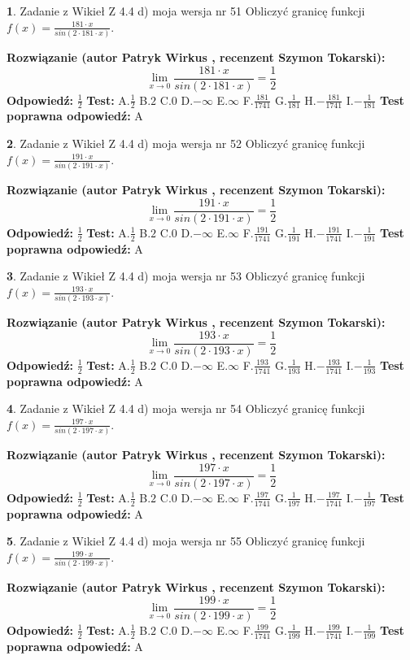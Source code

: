 \documentclass[12pt, a4paper]{article}
\theoremstyle{definition} %
\newtheorem{zad}{}
\newcommand{\zadStart}[1]{\begin{zad}#1\newline}
\newcommand{\zadStop}{\end{zad}}
\newcommand{\rozwStart}[2]{\noindent \textbf{Rozwiązanie (autor #1 , recenzent #2): }\newline}
\newcommand{\rozwStop}{\newline}
\newcommand{\odpStart}{\noindent \textbf{Odpowiedź:}\newline}
\newcommand{\odpStop}{\newline}
\newcommand{\testStart}{\noindent \textbf{Test:}\newline}
\newcommand{\testStop}{\newline}
\newcommand{\kluczStart}{\noindent \textbf{Test poprawna odpowiedź:}\newline}
\newcommand{\kluczStop}{\newline}
\begin{document}
\zadStart{Zadanie z Wikieł Z 4.4 d) moja wersja nr 51}
Obliczyć granicę funkcji $f(x)=\frac{181\cdot x}{sin(2 \cdot181\cdot x)}$.
\zadStop
\rozwStart{Patryk Wirkus}{Szymon Tokarski}
$$\lim\limits_{x\to 0}\frac{181\cdot x}{sin(2 \cdot181\cdot x)}=\frac{1}{2}$$
\rozwStop
\odpStart
$\frac{1}{2}$
\odpStop
\testStart
A.$\frac{1}{2}$
B.$2$
C.$0$
D.$-\infty$
E.$\infty$
F.$\frac{181}{1741}$
G.$\frac{1}{181}$
H.$-\frac{181}{1741}$
I.$-\frac{1}{181}$
\testStop
\kluczStart
A
\kluczStop



\zadStart{Zadanie z Wikieł Z 4.4 d) moja wersja nr 52}
Obliczyć granicę funkcji $f(x)=\frac{191\cdot x}{sin(2 \cdot191\cdot x)}$.
\zadStop
\rozwStart{Patryk Wirkus}{Szymon Tokarski}
$$\lim\limits_{x\to 0}\frac{191\cdot x}{sin(2 \cdot191\cdot x)}=\frac{1}{2}$$
\rozwStop
\odpStart
$\frac{1}{2}$
\odpStop
\testStart
A.$\frac{1}{2}$
B.$2$
C.$0$
D.$-\infty$
E.$\infty$
F.$\frac{191}{1741}$
G.$\frac{1}{191}$
H.$-\frac{191}{1741}$
I.$-\frac{1}{191}$
\testStop
\kluczStart
A
\kluczStop



\zadStart{Zadanie z Wikieł Z 4.4 d) moja wersja nr 53}
Obliczyć granicę funkcji $f(x)=\frac{193\cdot x}{sin(2 \cdot193\cdot x)}$.
\zadStop
\rozwStart{Patryk Wirkus}{Szymon Tokarski}
$$\lim\limits_{x\to 0}\frac{193\cdot x}{sin(2 \cdot193\cdot x)}=\frac{1}{2}$$
\rozwStop
\odpStart
$\frac{1}{2}$
\odpStop
\testStart
A.$\frac{1}{2}$
B.$2$
C.$0$
D.$-\infty$
E.$\infty$
F.$\frac{193}{1741}$
G.$\frac{1}{193}$
H.$-\frac{193}{1741}$
I.$-\frac{1}{193}$
\testStop
\kluczStart
A
\kluczStop



\zadStart{Zadanie z Wikieł Z 4.4 d) moja wersja nr 54}
Obliczyć granicę funkcji $f(x)=\frac{197\cdot x}{sin(2 \cdot197\cdot x)}$.
\zadStop
\rozwStart{Patryk Wirkus}{Szymon Tokarski}
$$\lim\limits_{x\to 0}\frac{197\cdot x}{sin(2 \cdot197\cdot x)}=\frac{1}{2}$$
\rozwStop
\odpStart
$\frac{1}{2}$
\odpStop
\testStart
A.$\frac{1}{2}$
B.$2$
C.$0$
D.$-\infty$
E.$\infty$
F.$\frac{197}{1741}$
G.$\frac{1}{197}$
H.$-\frac{197}{1741}$
I.$-\frac{1}{197}$
\testStop
\kluczStart
A
\kluczStop



\zadStart{Zadanie z Wikieł Z 4.4 d) moja wersja nr 55}
Obliczyć granicę funkcji $f(x)=\frac{199\cdot x}{sin(2 \cdot199\cdot x)}$.
\zadStop
\rozwStart{Patryk Wirkus}{Szymon Tokarski}
$$\lim\limits_{x\to 0}\frac{199\cdot x}{sin(2 \cdot199\cdot x)}=\frac{1}{2}$$
\rozwStop
\odpStart
$\frac{1}{2}$
\odpStop
\testStart
A.$\frac{1}{2}$
B.$2$
C.$0$
D.$-\infty$
E.$\infty$
F.$\frac{199}{1741}$
G.$\frac{1}{199}$
H.$-\frac{199}{1741}$
I.$-\frac{1}{199}$
\testStop
\kluczStart
A
\kluczStop
\end{document}
